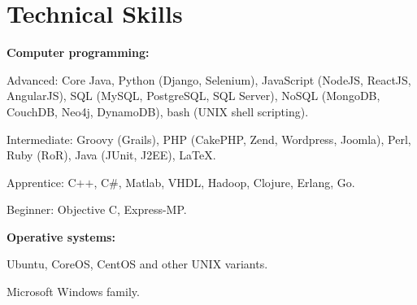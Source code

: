 

\section{Technical Skills}
%
% 
% 
\textbf{Computer programming:}

    \begin{innerlist}
\item Advanced: Core Java, Python (Django, Selenium), JavaScript
(NodeJS, ReactJS, AngularJS), SQL (MySQL, PostgreSQL,
SQL Server), NoSQL (MongoDB, CouchDB, Neo4j, DynamoDB), bash (UNIX shell
scripting).
\item Intermediate: Groovy (Grails), PHP
(CakePHP, Zend, Wordpress, Joomla), Perl, Ruby (RoR), 
Java (JUnit, J2EE), \LaTeX{}.
\item Apprentice: C$+$$+$, C\#, Matlab, VHDL, Hadoop, Clojure,
Erlang, Go.
\item Beginner: Objective C, Express-MP.
    \end{innerlist}

\halfblankline

\textbf{Operative systems:}
    \begin{innerlist}
\item Ubuntu, CoreOS, CentOS and other UNIX variants.
\item Microsoft Windows family.
    \end{innerlist}

\halfblankline

